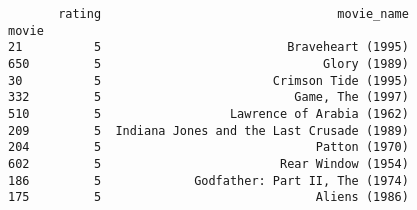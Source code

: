 \documentclass[12pt,fleqn]{article}\usepackage{../common}
\begin{document}
\begin{verbatim}
       rating                                 movie_name
movie                                                   
21          5                          Braveheart (1995)
650         5                               Glory (1989)
30          5                        Crimson Tide (1995)
332         5                           Game, The (1997)
510         5                  Lawrence of Arabia (1962)
209         5  Indiana Jones and the Last Crusade (1989)
204         5                              Patton (1970)
602         5                         Rear Window (1954)
186         5             Godfather: Part II, The (1974)
175         5                              Aliens (1986)
\end{verbatim}
\end{document}
